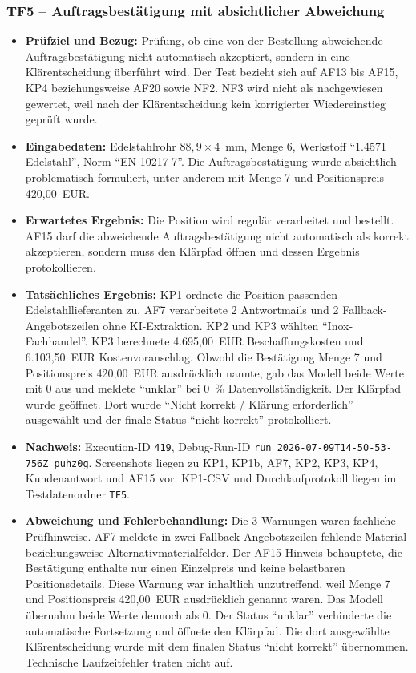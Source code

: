\documentclass[a4paper,12pt]{article}
\begin{document}
\subsubsection{TF5 -- Auftragsbestätigung mit absichtlicher Abweichung}

\begin{itemize}
    \setlength{\itemsep}{3pt}
    \setlength{\parsep}{0pt}
    \item \textbf{Prüfziel und Bezug:} Prüfung, ob eine von der Bestellung abweichende Auftragsbestätigung nicht automatisch akzeptiert, sondern in eine Klärentscheidung überführt wird. Der Test bezieht sich auf AF13 bis AF15, KP4 beziehungsweise AF20 sowie NF2. NF3 wird nicht als nachgewiesen gewertet, weil nach der Klärentscheidung kein korrigierter Wiedereinstieg geprüft wurde.
    \item \textbf{Eingabedaten:} Edelstahlrohr \(88{,}9 \times 4\)~mm, Menge 6, Werkstoff \enquote{1.4571 Edelstahl}, Norm \enquote{EN 10217-7}. Die Auftragsbestätigung wurde absichtlich problematisch formuliert, unter anderem mit Menge 7 und Positionspreis 420,00~EUR.
    \item \textbf{Erwartetes Ergebnis:} Die Position wird regulär verarbeitet und bestellt. AF15 darf die abweichende Auftragsbestätigung nicht automatisch als korrekt akzeptieren, sondern muss den Klärpfad öffnen und dessen Ergebnis protokollieren.
    \item \textbf{Tatsächliches Ergebnis:} KP1 ordnete die Position passenden Edelstahllieferanten zu. AF7 verarbeitete 2 Antwortmails und 2 Fallback-Angebotszeilen ohne KI-Extraktion. KP2 und KP3 wählten \enquote{Inox-Fachhandel}. KP3 berechnete 4.695,00~EUR Beschaffungskosten und 6.103,50~EUR Kostenvoranschlag. Obwohl die Bestätigung Menge 7 und Positionspreis 420,00~EUR ausdrücklich nannte, gab das Modell beide Werte mit 0 aus und meldete \enquote{unklar} bei 0~\% Datenvollständigkeit. Der Klärpfad wurde geöffnet. Dort wurde \enquote{Nicht korrekt / Klärung erforderlich} ausgewählt und der finale Status \enquote{nicht korrekt} protokolliert.
    \item \textbf{Nachweis:} Execution-ID \texttt{419}, Debug-Run-ID \nolinkurl{run_2026-07-09T14-50-53-756Z_puhz0g}. Screenshots liegen zu KP1, KP1b, AF7, KP2, KP3, KP4, Kundenantwort und AF15 vor. KP1-CSV und Durchlaufprotokoll liegen im Testdatenordner \nolinkurl{TF5}.
    \item \textbf{Abweichung und Fehlerbehandlung:} Die 3 Warnungen waren fachliche Prüfhinweise. AF7 meldete in zwei Fallback-Angebotszeilen fehlende Material- beziehungsweise Alternativmaterialfelder. Der AF15-Hinweis behauptete, die Bestätigung enthalte nur einen Einzelpreis und keine belastbaren Positionsdetails. Diese Warnung war inhaltlich unzutreffend, weil Menge 7 und Positionspreis 420,00~EUR ausdrücklich genannt waren. Das Modell übernahm beide Werte dennoch als 0. Der Status \enquote{unklar} verhinderte die automatische Fortsetzung und öffnete den Klärpfad. Die dort ausgewählte Klärentscheidung wurde mit dem finalen Status \enquote{nicht korrekt} übernommen. Technische Laufzeitfehler traten nicht auf.

\end{itemize}
\end{document}
